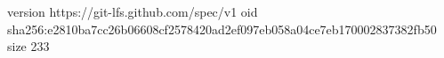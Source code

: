 version https://git-lfs.github.com/spec/v1
oid sha256:e2810ba7cc26b06608cf2578420ad2ef097eb058a04ce7eb170002837382fb50
size 233
